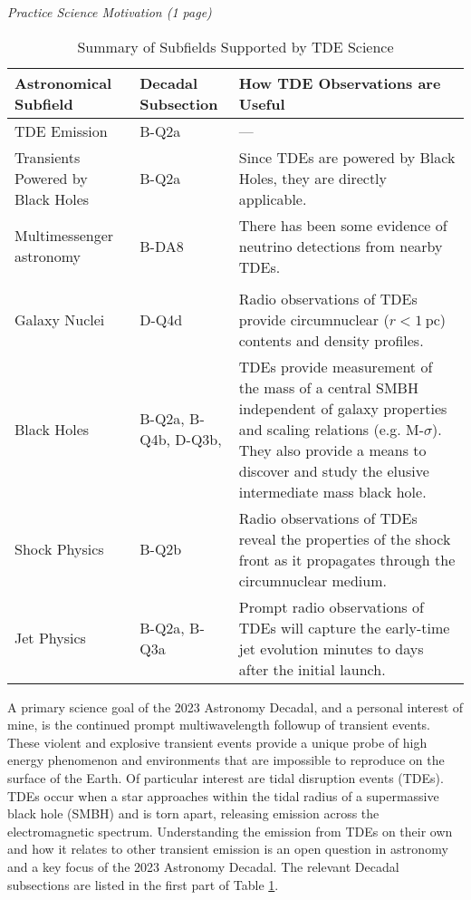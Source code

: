 \documentclass[12pt]{article}
\begin{document}
\thispagestyle{hdr}

{\it \large Practice Science Motivation (1 page)}

\begin{table}[!ht]
    \centering
    \caption{Summary of Subfields Supported by TDE Science}
    \label{tab:motivation}
    \begin{tabular}{p{4cm} p{3cm} p{8cm}}
    \hline
        Astronomical Subfield & Decadal Subsection & How TDE Observations are Useful \\
        \hline
        TDE Emission & B-Q2a & --- \\
        Transients Powered by Black Holes & B-Q2a & Since TDEs are powered by Black Holes, they are directly applicable. \\
        Multimessenger astronomy & B-DA8 & There has been some evidence of neutrino detections from nearby TDEs. \\
        \hline \\ 
        Galaxy Nuclei & D-Q4d & Radio observations of TDEs provide circumnuclear ($r < 1~\textrm{pc}$) contents and density profiles. \\
        Black Holes & B-Q2a, B-Q4b, D-Q3b,  & TDEs provide measurement of the mass of a central SMBH independent of galaxy properties and scaling relations (e.g. M-$\sigma$). They also provide a means to discover and study the elusive intermediate mass black hole. \\
        Shock Physics & B-Q2b & Radio observations of TDEs reveal the properties of the shock front as it propagates through the circumnuclear medium. \\
        Jet Physics & B-Q2a, B-Q3a & Prompt radio observations of TDEs will capture the early-time jet evolution minutes to days after the initial launch. \\
         \hline 
    \end{tabular}
\end{table}

\indent A primary science goal of the 2023 Astronomy Decadal, and a personal interest of mine, is the continued prompt multiwavelength followup of transient events. These violent and explosive transient events provide a unique probe of high energy phenomenon and environments that are impossible to reproduce on the surface of the Earth. Of particular interest are tidal disruption events (TDEs). TDEs occur when a star approaches within the tidal radius of a supermassive black hole (SMBH) and is torn apart, releasing emission across the electromagnetic spectrum. Understanding the emission from TDEs on their own and how it relates to other transient emission is an open question in astronomy and a key focus of the 2023 Astronomy Decadal. The relevant Decadal subsections are listed in the first part of Table \ref{tab:motivation}.
\end{document}
